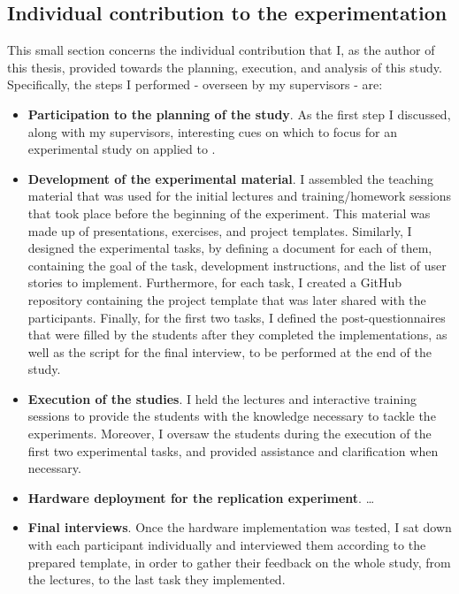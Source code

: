 \subsection{Individual contribution to the experimentation}
This small section concerns the individual contribution that I, as the author of this thesis, provided towards the planning, execution, and analysis of this study.
Specifically, the steps I performed - overseen by my supervisors - are:

\begin{itemize}
    \item \textbf{Participation to the planning of the study}. As the first step I discussed, along with my supervisors, interesting cues on which to focus for an experimental study on \tdd applied to \es.  

    \item \textbf{Development of the experimental material}. I assembled  the teaching material that was used for the initial lectures and training/homework sessions that took place before the beginning of the experiment. This material was made up of presentations, exercises, and project templates.
    Similarly, I designed the experimental tasks, by defining a document for each of them, containing the goal of the task, development instructions, and the list of user stories to implement. Furthermore, for each task, I created a GitHub repository containing the project template that was later shared with the participants.
    Finally, for the first two tasks, I defined the post-questionnaires that were filled by the students after they completed the implementations, as well as the script for the final interview, to be performed at the end of the study.

    \item \textbf{Execution of the studies}. 
    I held the lectures and interactive training sessions to provide the students with the knowledge necessary to tackle the experiments. 
    Moreover, I oversaw the students during the execution of the first two experimental tasks, and provided assistance and clarification when necessary.

    \item \textbf{Hardware deployment for the replication experiment}.
    \dots
    
    \item\textbf{Final interviews}.
    Once the hardware implementation was tested, I sat down with each participant individually and interviewed them according to the prepared template, in order to gather their feedback on the whole study, from the lectures, to the last task they implemented.


\end{itemize}
